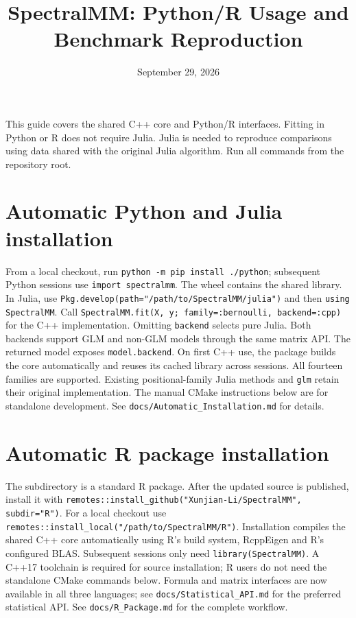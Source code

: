 \documentclass[10pt,a4paper]{article}
\title{SpectralMM: Python/R Usage and Benchmark Reproduction}
\author{}
\date{September 29, 2026}
\begin{document}

\maketitle
\vspace{-1.5em}
This guide covers the shared C++ core and Python/R interfaces. Fitting in Python
or R does not require Julia. Julia is needed to reproduce comparisons using data
shared with the original Julia algorithm. Run all commands from the repository root.

\section*{Automatic Python and Julia installation}
From a local checkout, run \texttt{python -m pip install ./python}; subsequent Python
sessions use \texttt{import spectralmm}. The wheel contains the shared library.
In Julia, use \texttt{Pkg.develop(path="/path/to/SpectralMM/julia")} and then
\texttt{using SpectralMM}. Call \texttt{SpectralMM.fit(X, y; family=:bernoulli, backend=:cpp)}
for the C++ implementation. Omitting \texttt{backend} selects pure Julia.
Both backends support GLM and non-GLM models through the same matrix API.
The returned model exposes \texttt{model.backend}. On first C++ use, the package builds the core automatically and reuses
its cached library across sessions. All fourteen families are supported.
Existing positional-family Julia methods and \texttt{glm} retain their original
implementation. The manual CMake instructions below are for standalone development.
See \texttt{docs/Automatic\_Installation.md} for details.

\section*{Automatic R package installation}
The  subdirectory is a standard R package. After the updated source is
published, install it with \texttt{remotes::install\_github("Xunjian-Li/SpectralMM", subdir="R")}.
For a local checkout use \texttt{remotes::install\_local("/path/to/SpectralMM/R")}.
Installation compiles the shared C++ core automatically using R's build system,
RcppEigen and R's configured BLAS. Subsequent sessions only need
\texttt{library(SpectralMM)}. A C++17 toolchain is required for source installation;
R users do not need the standalone CMake commands below. Formula and matrix interfaces are now available in all three languages; see
\texttt{docs/Statistical\_API.md} for the preferred statistical API. See \texttt{docs/R\_Package.md} for the complete workflow.
\end{document}
